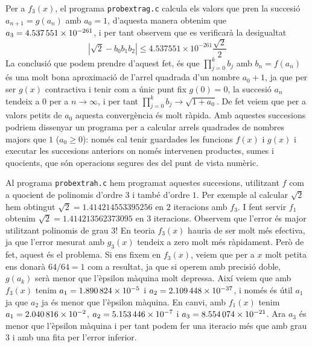 \documentclass[12pt]{article}
\begin{document}
Per a $f_3(x)$, el programa \texttt{probextrag.c} calcula els valors que pren la succesió $a_{n+1}=g(a_n)$ amb $a_0=1$, d'aquesta manera obtenim que \( a_3 = \num{4.537551d-261} \), i per tant observem que es verificarà la desigualtat
\begin{equation}
	|\sqrt{2}-b_0b_1b_2|\leq4.537551\times10^{-261}\frac{\sqrt{2}}{2}
\end{equation}
La conclusió que podem prendre d'aquest fet, és que $\prod_{j=0}^{k}b_j$ amb $b_n=f(a_n)$ és una molt bona aproximació de l'arrel quadrada d'un nombre $a_0+1$, ja que per ser $g(x)$ contractiva i tenir com a únic punt fix $g(0)=0$, la succesió $a_n$ tendeix a $0$ per a $n\to\infty$, i per tant $\prod_{j=0}^{k}b_j\to\sqrt{1+a_0}$. De fet veiem que per a valors petits de $a_0$ aquesta convergència és molt ràpida. Amb aquestes succesions podriem dissenyar un programa per a calcular arrels quadrades de nombres majors que $1$ ($a_0\geq0$): només cal tenir guardades les funcions $f(x)$ i $g(x)$ i executar les succesions anteriors on només intervenen productes, sumes i quocients, que són operacions segures des del punt de vista numèric. 

Al programa \texttt{probextrah.c} hem programat aquestes succesions, utilitzant $f$ com a quocient de polinomis d'ordre $3$ i també d'ordre $1$. Per exemple al calcular $\sqrt{2}$ hem obtingut $\sqrt{2}=\num{1.414214553395256}$ en $2$ iteracions amb $f_3$. I fent servir \( f_1 \) obtenim $\sqrt{2}=\num{1.414213562373095}$ en $3$ iteracions. Observem que l'error és major utilitzant polinomis de grau $3$! En teoria $f_3(x)$ hauria de ser molt més efectiva, ja que l'error mesurat amb $g_3(x)$ tendeix a zero molt més ràpidament. Però de fet, aquest és el problema. Si ens fixem en $f_3(x)$, veiem que per a $x$ molt petita ens donarà $64/64=1$ com a resultat, ja que si operem amb precisió doble, \( g(a_k) \) serà menor que l'èpsilon màquina molt depressa. Així veiem que amb $f_3(x)$ tenim $a_1= \num{1.890824d-5}$ i $a_2= \num{2.109448d-37}$, i només és útil $a_1$ ja que \( a_2 \) ja és menor que l'èpsilon màquina. En canvi, amb $f_1(x)$ tenim $a_1=\num{2.040816d-2}$, $a_2=\num{5.153446d-7}$ i $a_3=\num{8.554074d-21}$. Ara \( a_3 \) és menor que l'èpsilon màquina i per tant podem fer una iteracio més que amb grau 3 i amb una fita per l'error inferior. 
\end{document}
